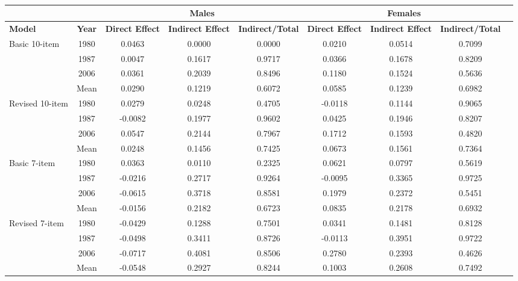 \documentclass[12pt]{report}
\newcommand{\prbf}[1]{\textbf{#1}}
\begin{document}
\begin{sidewaystable}
\small
\caption{\label{tab:gender}}
\vspace{2pt}
\centering\begin{tabular}{lc|c|c|c|c|c|cc}
\hline
\hline
& & \multicolumn{3}{|c|}{Males} & \multicolumn{3}{|c}{Females}\\
\hline
\prbf{Model} & \prbf{Year} & \prbf{Direct Effect} & \prbf{Indirect Effect} & \prbf{Indirect/Total} & \prbf{Direct Effect} & \prbf{Indirect Effect} & \prbf{Indirect/Total}\\
\hline
Basic 10-item & 1980 & 0.0463 & 0.0000 & 0.0000 & 0.0210 & 0.0514 & 0.7099\\
& 1987 & 0.0047 & 0.1617 & 0.9717 & 0.0366 & 0.1678 & 0.8209\\
& 2006 & 0.0361 & 0.2039 & 0.8496 & 0.1180 & 0.1524 & 0.5636\\
& Mean & 0.0290 & 0.1219 & 0.6072 & 0.0585 & 0.1239 & 0.6982\\
\hline
Revised 10-item & 1980 & 0.0279 & 0.0248 & 0.4705 & -0.0118 & 0.1144 & 0.9065\\
& 1987 & -0.0082 & 0.1977 & 0.9602 & 0.0425 & 0.1946 & 0.8207\\
& 2006 & 0.0547 & 0.2144 & 0.7967 & 0.1712 & 0.1593 & 0.4820\\
& Mean & 0.0248 & 0.1456 & 0.7425 & 0.0673 & 0.1561 & 0.7364\\
\hline
Basic 7-item & 1980 & 0.0363 & 0.0110 & 0.2325 & 0.0621 & 0.0797 & 0.5619\\
& 1987 & -0.0216 & 0.2717 & 0.9264 & -0.0095 & 0.3365 & 0.9725\\
& 2006 & -0.0615 & 0.3718 & 0.8581 & 0.1979 & 0.2372 & 0.5451\\
& Mean & -0.0156 & 0.2182 & 0.6723 & 0.0835 & 0.2178 & 0.6932\\
\hline
Revised 7-item & 1980 & -0.0429 & 0.1288 & 0.7501 & 0.0341 & 0.1481 & 0.8128\\
& 1987 & -0.0498 & 0.3411 & 0.8726 & -0.0113 & 0.3951 & 0.9722\\
& 2006 & -0.0717 & 0.4081 & 0.8506 & 0.2780 & 0.2393 & 0.4626\\
& Mean & -0.0548 & 0.2927 & 0.8244 & 0.1003 & 0.2608 & 0.7492\\
\hline
\hline
\end{tabular}
\end{sidewaystable}
\end{document}
